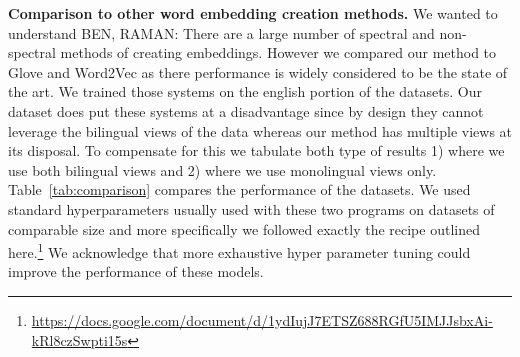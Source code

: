 \documentclass[11pt]{article}
\begin{document}
\textbf{Comparison to other word embedding creation methods.}
We wanted to understand 
{BEN, RAMAN: There are a large number of spectral and non-spectral
  methods of creating embeddings. However we compared our method to
  Glove and Word2Vec as there performance is widely considered to be
  the state of the art.} We trained those systems on the english
portion of the datasets. Our dataset does put these systems at a
disadvantage since by design they cannot leverage the bilingual views of
the data whereas our method has multiple views at its disposal. To
compensate for this we tabulate both type of results 1) where we use
both bilingual views and 2) where we use monolingual views
only. Table~\ref{tab:comparison} compares the performance of the
datasets. We used standard hyperparameters usually used with these two
programs on datasets of comparable size and more specifically we
followed exactly the recipe outlined
here.\footnote{\url{https://docs.google.com/document/d/1ydIujJ7ETSZ688RGfU5IMJJsbxAi-kRl8czSwpti15s}}
We acknowledge that more exhaustive hyper parameter tuning could
improve the performance of these models.
\end{document}
